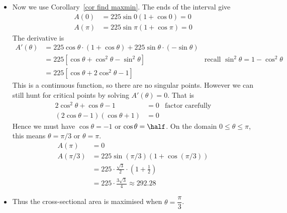 \begin{eg}
\begin{itemize}
\item Now we use Corollary~\ref{cor find maxmin}. The ends of the interval give
\begin{align*}
  A(0) &= 225 \sin 0 (1 + \cos 0) = 0 \\
  A(\pi) &= 225 \sin \pi ( 1+ \cos \pi) = 0
\end{align*}
The derivative is
\begin{align*}
  A'(\theta) &= 225 \cos\theta \cdot (1+\cos\theta) + 225 \sin\theta \cdot(-\sin\theta) \\
  &= 225 \left[ \cos \theta + \cos^2\theta - \sin^2\theta \right]
&\text {recall $\sin^2\theta = 1 - \cos^2\theta$}\\
  &= 225 \left[ \cos\theta +2\cos^2\theta -1 \right]
\end{align*}
This is a continuous function, so there are no singular points. However we can still hunt
for critical points by solving $A'(\theta) = 0$. That is
\begin{align*}
  2\cos^2\theta + \cos \theta -1 &= 0 & \text{factor carefully}\\
  (2\cos\theta -1)(\cos \theta+1) &= 0
\end{align*}
Hence we must have $\cos \theta =-1$ or $\cos\theta = \half$. On the domain $0\leq \theta
\leq \pi$, this means $\theta = \pi/3$ or $\theta = \pi$.
\begin{align*}
  A(\pi) &= 0 \\
  A(\pi/3) &= 225 \sin(\pi/3) (1 + \cos(\pi/3)) \\
  & = 225 \cdot \frac{\sqrt{3}}{2} \cdot \left( 1 + \frac{1}{2} \right) \\
  &= 225 \cdot \frac{3\sqrt{3}}{4} \approx 292.28
\end{align*}
\item Thus the cross-sectional area is maximised when $\theta = \dfrac{\pi}{3}$.
\end{itemize}
\end{eg}



